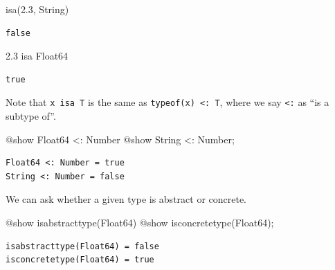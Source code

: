 \documentclass[
]{article}
\newenvironment{Shaded}{\begin{snugshade}}{\end{snugshade}}
\newcommand{\DataTypeTok}[1]{\textcolor[rgb]{0.68,0.00,0.00}{#1}}
\newcommand{\FloatTok}[1]{\textcolor[rgb]{0.68,0.00,0.00}{#1}}
\newcommand{\FunctionTok}[1]{\textcolor[rgb]{0.28,0.35,0.67}{#1}}
\newcommand{\NormalTok}[1]{\textcolor[rgb]{0.00,0.23,0.31}{#1}}
\newcommand{\OperatorTok}[1]{\textcolor[rgb]{0.37,0.37,0.37}{#1}}
\newcommand{\PreprocessorTok}[1]{\textcolor[rgb]{0.68,0.00,0.00}{#1}}
\begin{document}
\begin{Shaded}
\begin{Highlighting}[]
\FunctionTok{isa}\NormalTok{(}\FloatTok{2.3}\NormalTok{, }\DataTypeTok{String}\NormalTok{)}
\end{Highlighting}
\end{Shaded}

\begin{verbatim}
false
\end{verbatim}

\begin{Shaded}
\begin{Highlighting}[]
\FloatTok{2.3}\NormalTok{ isa }\DataTypeTok{Float64}
\end{Highlighting}
\end{Shaded}

\begin{verbatim}
true
\end{verbatim}

Note that \texttt{x\ isa\ T} is the same as
\texttt{typeof(x)\ \textless{}:\ T}, where we say \texttt{\textless{}:}
as ``is a subtype of''.

\begin{Shaded}
\begin{Highlighting}[]
\PreprocessorTok{@show} \DataTypeTok{Float64} \OperatorTok{\textless{}:}\DataTypeTok{ Number}
\PreprocessorTok{@show} \DataTypeTok{String} \OperatorTok{\textless{}:}\DataTypeTok{ Number}\NormalTok{;}
\end{Highlighting}
\end{Shaded}

\begin{verbatim}
Float64 <: Number = true
String <: Number = false
\end{verbatim}

We can ask whether a given type is abstract or concrete.

\begin{Shaded}
\begin{Highlighting}[]
\PreprocessorTok{@show} \FunctionTok{isabstracttype}\NormalTok{(}\DataTypeTok{Float64}\NormalTok{)}
\PreprocessorTok{@show} \FunctionTok{isconcretetype}\NormalTok{(}\DataTypeTok{Float64}\NormalTok{);}
\end{Highlighting}
\end{Shaded}

\begin{verbatim}
isabstracttype(Float64) = false
isconcretetype(Float64) = true
\end{verbatim}
\end{document}
